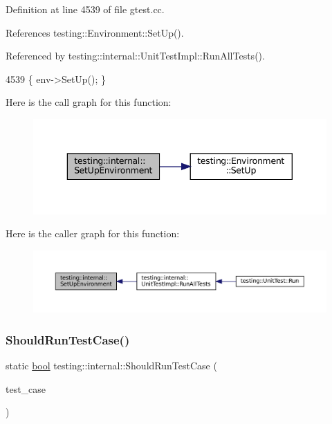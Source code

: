 Definition at line 4539 of file gtest.\+cc.



References testing\+::\+Environment\+::\+Set\+Up().



Referenced by testing\+::internal\+::\+Unit\+Test\+Impl\+::\+Run\+All\+Tests().


\begin{DoxyCode}
4539 \{ env->SetUp(); \}
\end{DoxyCode}
Here is the call graph for this function\+:
\nopagebreak
\begin{figure}[H]
\begin{center}
\leavevmode
\includegraphics[width=343pt]{namespacetesting_1_1internal_a5f5535012d4548788a5d1a4e0f18e19e_cgraph}
\end{center}
\end{figure}
Here is the caller graph for this function\+:
\nopagebreak
\begin{figure}[H]
\begin{center}
\leavevmode
\includegraphics[width=350pt]{namespacetesting_1_1internal_a5f5535012d4548788a5d1a4e0f18e19e_icgraph}
\end{center}
\end{figure}
\mbox{\label{namespacetesting_1_1internal_a73e562dfef3eb7b30dfbb7b5e88e6df2}} 
\subsubsection{\texorpdfstring{Should\+Run\+Test\+Case()}{ShouldRunTestCase()}}
{\footnotesize\ttfamily static \hyperlink{classbool}{bool} testing\+::internal\+::\+Should\+Run\+Test\+Case (\begin{DoxyParamCaption}\item[{const \hyperlink{classtesting_1_1TestCase}{Test\+Case} $\ast$}]{test\+\_\+case }\end{DoxyParamCaption})\hspace{0.3cm}{\ttfamily [static]}}



